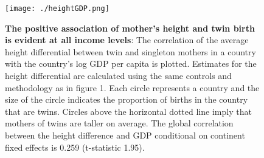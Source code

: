 \documentclass{nature}
\begin{document}
\begin{linenumbers}
\begin{spacing}{1}
\begin{figure}[htpb!]
  \texttt{[image: ./heightGDP.png]}
\vspace{5mm}
\caption{\textbf{The positive association of mother's height and twin birth is evident at all income levels}: {\footnotesize The correlation of the average height differential between twin and singleton mothers in a country with the country's log GDP per capita is plotted.  Estimates for the height differential are calculated using the same controls and methodology as in figure 1. Each circle represents a country and the size of the circle indicates the proportion of births in the country that are twins. Circles above the horizontal dotted line imply that mothers of twins are taller on average. The global correlation between the height difference and GDP conditional on continent fixed effects is 0.259 (t-statistic 1.95).}}
\label{fig:GDPEsts}
\end{figure}


\end{spacing}
\end{linenumbers}
\end{document}
